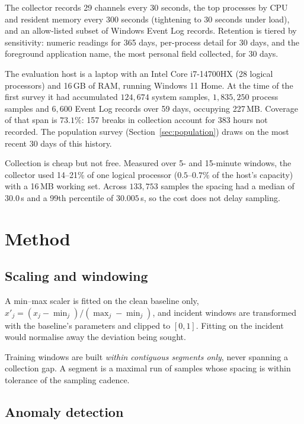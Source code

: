 \documentclass[conference]{IEEEtran}
\begin{document}
The collector records 29 channels every 30 seconds, the top processes by CPU
and resident memory every 300 seconds (tightening to 30 seconds under load),
and an allow-listed subset of Windows Event Log records. Retention is
tiered by sensitivity: numeric readings for 365 days, per-process detail for
30 days, and the foreground application name, the most personal field
collected, for 30 days.

The evaluation host is a laptop with an Intel Core i7-14700HX (28 logical
processors) and 16\,GB of RAM, running Windows 11 Home. At the time of the
first survey it had accumulated $124{,}674$ system
samples, $1{,}835{,}250$ process samples and $6{,}600$ Event Log records over
59 days, occupying 227\,MB. Coverage of that span is $73.1\%$: 157 breaks in
collection account for 383 hours not recorded. The population survey
(Section~\ref{sec:population}) draws on the most recent 30 days of this
history.

Collection is cheap but not free. Measured over 5- and 15-minute windows,
the collector used 14--21\% of one logical processor ($0.5$--$0.7\%$ of the
host's capacity) with a 16\,MB working set. Across $133{,}753$ samples the
spacing had a median of $30.0$\,s and a 99th percentile of $30.005$\,s, so
the cost does not delay sampling.

\section{Method}
\label{sec:method}

\subsection{Scaling and windowing}

A min--max scaler is fitted on the clean baseline only,
$x'_j = (x_j - \min_j)/(\max_j - \min_j)$, and incident windows are transformed
with the baseline's parameters and clipped to $[0,1]$. Fitting on the incident
would normalise away the deviation being sought.

Training windows are built \emph{within contiguous segments only}, never
spanning a collection gap. A segment is a maximal run of samples whose spacing
is within tolerance of the sampling cadence.

\subsection{Anomaly detection}
\end{document}
